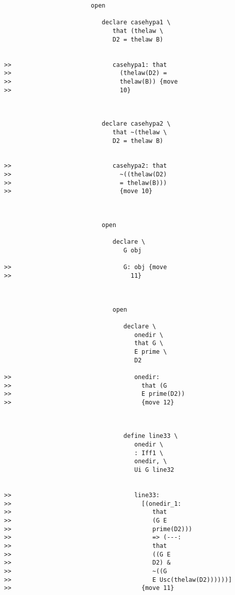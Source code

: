 \documentclass[12pt]{article}
\begin{document}
\begin{verbatim}
                        open

                           declare casehypa1 \
                              that (thelaw \
                              D2 = thelaw B)


>>                            casehypa1: that
>>                              (thelaw(D2) =
>>                              thelaw(B)) {move
>>                              10}



                           declare casehypa2 \
                              that ~(thelaw \
                              D2 = thelaw B)


>>                            casehypa2: that
>>                              ~((thelaw(D2)
>>                              = thelaw(B)))
>>                              {move 10}



                           open

                              declare \
                                 G obj

>>                               G: obj {move
>>                                 11}



                              open

                                 declare \
                                    onedir \
                                    that G \
                                    E prime \
                                    D2

>>                                  onedir:
>>                                    that (G
>>                                    E prime(D2))
>>                                    {move 12}



                                 define line33 \
                                    onedir \
                                    : Iff1 \
                                    onedir, \
                                    Ui G line32


>>                                  line33:
>>                                    [(onedir_1:
>>                                       that
>>                                       (G E
>>                                       prime(D2)))
>>                                       => (---:
>>                                       that
>>                                       ((G E
>>                                       D2) &
>>                                       ~((G
>>                                       E Usc(thelaw(D2))))))]
>>                                    {move 11}




\end{verbatim}
\end{document}
